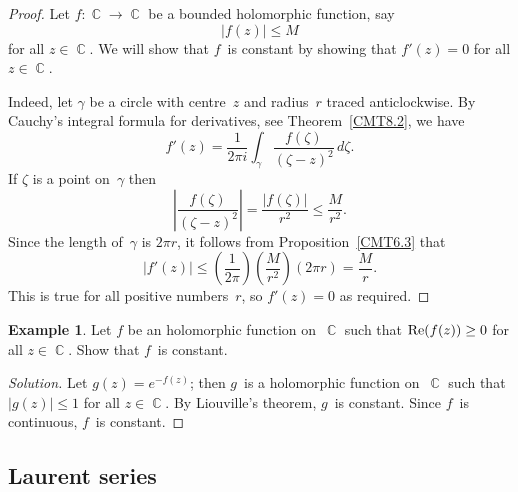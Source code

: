 \documentclass{amsproc}
\theoremstyle{definition}
\newtheorem{example}[theorem]{Example}
\newenvironment{solution}{\begin{proof}[Solution]}{\end{proof}}
\theoremstyle{remark}
\renewcommand{\Re}{\mathop{\textup{Re}}}
\DeclareMathOperator{\C}{\mathbb{C}}
\numberwithin{equation}{section}
\begin{document}
\begin{proof}
Let $ f: \C \to \C $ be a bounded holomorphic function, say
$$
|f(z)| \leq M
$$
for all $ z \in \C $. We will show that $ f $~is constant by showing that $ f'(z) = 0 $ for all $ z \in \C $.

Indeed, let $ \gamma $ be a circle with centre~$ z $ and radius~$ r $ traced anticlockwise. By Cauchy's integral formula for derivatives, see Theorem~\ref{CMT8.2},
we have
$$
f'(z) = \dfrac{1}{2\pi i} \int_\gamma \dfrac{f(\zeta)}{(\zeta - z)^2}\,d\zeta.
$$
If $ \zeta $ is a point on~$ \gamma $ then
$$
\left|\dfrac{f(\zeta)}{(\zeta - z)^2}\right| = \dfrac{|f(\zeta)|}{r^2} \leq \dfrac{M}{r^2}.
$$
Since the length of~$ \gamma $ is $ 2\pi r $, it follows from Proposition~\ref{CMT6.3} that
$$
|f'(z)| \leq \left(\dfrac{1}{2 \pi}\right) \left(\dfrac{M}{r^2}\right)(2\pi r) = \dfrac{M}{r}.
$$
This is true for all positive numbers~$ r $, so $ f'(z) = 0 $ as required.
\end{proof}


\begin{example} \label{CME9.3}
Let $ f $ be an holomorphic function on~$ \C $ such that $ \Re(f(z)) \geq 0 $ for all $ z \in \C $. Show that $ f $~is constant.
\end{example}

\begin{solution}
Let $ g(z) = e^{-f(z)} $; then $ g $~is a holomorphic function on~$ \C $ such that $ |g(z)| \leq 1 $ for all $ z \in \C $. By Liouville's theorem, $ g $~is constant.
Since $ f $~is continuous, $ f $~is constant.
\end{solution}

\vfill\pagebreak


\subsection{Laurent series} \label{CMS10}
\end{document}
